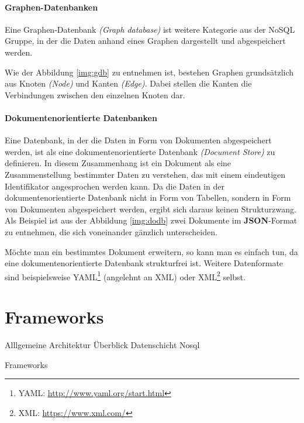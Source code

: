 \paragraph{Graphen-Datenbanken}
Eine Graphen-Datenbank \textit{(Graph database)} ist weitere Kategorie aus der NoSQL Gruppe, in der die Daten anhand eines Graphen dargestellt und abgespeichert werden.


Wie der Abbildung \ref{img:gdb} zu entnehmen ist, bestehen Graphen grundsätzlich aus Knoten \textit{(Node)} und Kanten \textit{(Edge)}. Dabei stellen die Kanten die Verbindungen zwischen den einzelnen Knoten dar.

\paragraph{Dokumentenorientierte Datenbanken}

Eine Datenbank, in der die Daten in Form von Dokumenten abgespeichert werden, ist als eine dokumentenorientierte Datenbank \textit{(Document Store)} zu definieren. In diesem Zusammenhang ist ein Dokument als eine Zusammenstellung bestimmter Daten zu verstehen, das mit einem eindeutigen Identifikator angesprochen werden kann. Da die Daten in der dokumentenorientierte Datenbank nicht in Form von Tabellen, sondern in Form von Dokumenten abgespeichert werden, ergibt sich daraus keinen Strukturzwang. Als Beispiel ist aus der Abbildung \ref{img:dodb} zwei Dokumente im \textbf{JSON}-Format zu entnehmen, die sich voneinander gänzlich unterscheiden.


Möchte man ein bestimmtes Dokument erweitern, so kann man es einfach tun, da eine dokumentenorientierte Datenbank strukturfrei ist. Weitere Datenformate sind beispielsweise YAML\footnote{YAML: \url{http://www.yaml.org/start.html}} (angelehnt an XML) oder XML\footnote{XML: \url{https://www.xml.com/}} selbst.










\section{Frameworks}





Alllgemeine Architektur
    Überblick
    Datenschicht
        Nosql

Frameworks